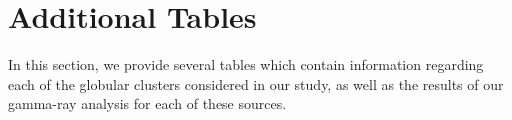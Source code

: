 \section{Additional Tables}
\label{sec:app-tables}
In this section, we provide several tables which contain information regarding each of the globular clusters considered in our study, as well as the results of our gamma-ray analysis for each of these sources.


\newpage






